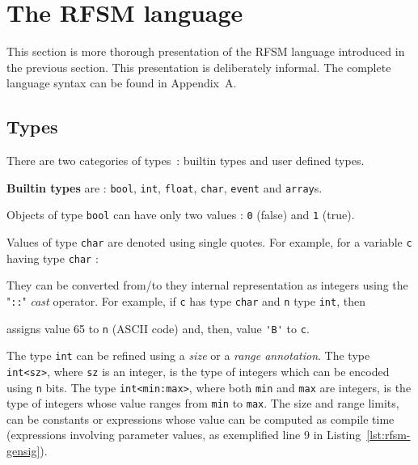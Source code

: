 \clearpage
\section{The RFSM language}
\label{sec:rfsm-language}

This section is more thorough presentation of the RFSM language introduced in the previous
section. This presentation is deliberately informal. The complete language syntax can
be found in Appendix~A.

\subsection{Types}
\label{sec:types}

There are two categories of types~: builtin types and user defined types.

\medskip
\textbf{Builtin types} are : \texttt{bool}, \texttt{int}, \texttt{float}, \texttt{char}, \texttt{event} and
\texttt{array}s.

\step Objects of type \texttt{bool} can have only two values : \texttt{0} (false) and \texttt{1} (true).

\step Values of type \texttt{char} are
denoted using single quotes. For example, for a variable \verb|c| having type \verb|char| :
\begin{center}
\end{center}
They can be converted from/to they internal representation as integers using the "\verb|::|" \emph{cast}
operator. For example, if \verb|c| has type \verb|char| and \verb|n| type \verb|int|, then 
\begin{center}
\end{center}
assigns value 65 to \verb|n| (ASCII code) and, then, value \verb|'B'| to \verb|c|.


\step The type \texttt{int} can be refined using a \emph{size} or a \emph{range annotation}. The
type \verb|int<sz>|, where \verb|sz| is an integer, is the type of integers which can be encoded using
\verb|n| bits. The type \verb|int<min:max>|, where both \verb|min| and \verb|max| are integers, is
the type of integers whose value ranges from \verb|min| to \verb|max|. The size and range limits,
can be constants or expressions whose value can be computed as compile time
(expressions involving parameter values, as exemplified line 9 in Listing~\ref{lst:rfsm-gensig}).

